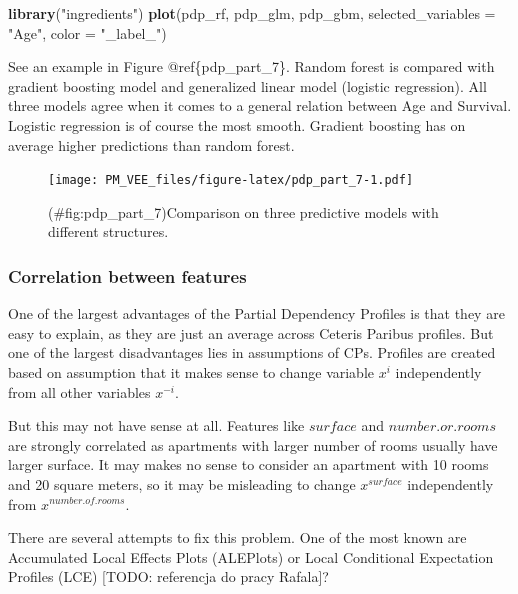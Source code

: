\documentclass[]{krantz}
\newenvironment{Shaded}{\begin{snugshade}}{\end{snugshade}}
\newcommand{\DataTypeTok}[1]{\textcolor[rgb]{0.13,0.29,0.53}{#1}}
\newcommand{\KeywordTok}[1]{\textcolor[rgb]{0.13,0.29,0.53}{\textbf{#1}}}
\newcommand{\NormalTok}[1]{#1}
\newcommand{\StringTok}[1]{\textcolor[rgb]{0.31,0.60,0.02}{#1}}
\theoremstyle{definition}
\theoremstyle{definition}
\theoremstyle{definition}
\theoremstyle{remark}
\begin{document}
\begin{Shaded}
\begin{Highlighting}[]
\KeywordTok{library}\NormalTok{(}\StringTok{"ingredients"}\NormalTok{)}
\KeywordTok{plot}\NormalTok{(pdp_rf, pdp_glm, pdp_gbm, }\DataTypeTok{selected_variables =} \StringTok{"Age"}\NormalTok{, }\DataTypeTok{color =} \StringTok{"_label_"}\NormalTok{)}
\end{Highlighting}
\end{Shaded}

See an example in Figure @ref\{pdp\_part\_7\}. Random forest is compared
with gradient boosting model and generalized linear model (logistic
regression). All three models agree when it comes to a general relation
between Age and Survival. Logistic regression is of course the most
smooth. Gradient boosting has on average higher predictions than random
forest.

\begin{figure}
\centering
\texttt{[image: PM\_VEE\_files/figure-latex/pdp\_part\_7-1.pdf]}
\caption{(\#fig:pdp\_part\_7)Comparison on three predictive models with
different structures.}
\end{figure}

\hypertarget{correlation-between-features}{%
\subsubsection{Correlation between
features}\label{correlation-between-features}}

One of the largest advantages of the Partial Dependency Profiles is that
they are easy to explain, as they are just an average across Ceteris
Paribus profiles. But one of the largest disadvantages lies in
assumptions of CPs. Profiles are created based on assumption that it
makes sense to change variable \(x^i\) independently from all other
variables \(x^{-i}\).

But this may not have sense at all. Features like \(surface\) and
\(number.or.rooms\) are strongly correlated as apartments with larger
number of rooms usually have larger surface. It may makes no sense to
consider an apartment with 10 rooms and 20 square meters, so it may be
misleading to change \(x^{surface}\) independently from
\(x^{number.of.rooms}\).

There are several attempts to fix this problem. One of the most known
are Accumulated Local Effects Plots (ALEPlots) \citep{R-ALEPlot} or
Local Conditional Expectation Profiles (LCE) {[}TODO: referencja do
pracy Rafala{]}?
\end{document}
